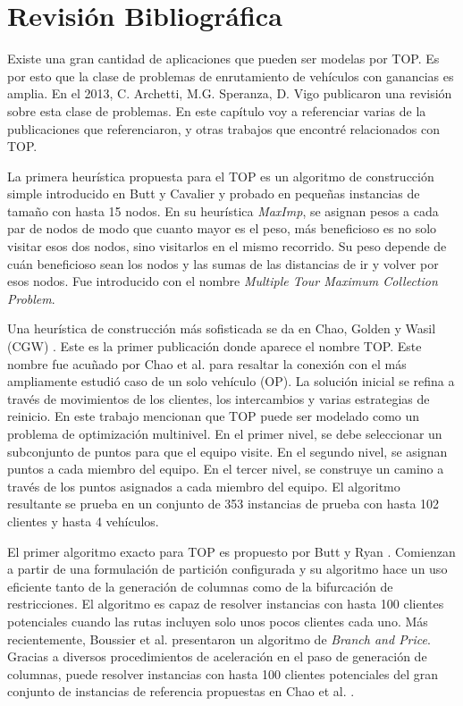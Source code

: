 

\chapter{Revisión Bibliográfica}

Existe una gran cantidad de aplicaciones que pueden ser modelas por TOP. Es por esto que la clase de problemas de enrutamiento de vehículos con ganancias es amplia. En el 2013, C. Archetti, M.G. Speranza, D. Vigo \cite{ArchettiSperanzaVigo} publicaron una revisión sobre esta clase de problemas. En este capítulo voy a referenciar varias de la publicaciones que referenciaron, y otras trabajos que encontré relacionados con TOP.

\bigskip

La primera heurística propuesta para el TOP es un algoritmo de construcción simple introducido en Butt y Cavalier \cite{ButtCavalier} y probado en pequeñas instancias de tamaño con hasta 15 nodos. En su heurística \textit{MaxImp}, se asignan pesos a cada par de nodos de modo que cuanto mayor es el peso, más beneficioso es no solo visitar esos dos nodos, sino visitarlos en el mismo recorrido. Su peso depende de cuán beneficioso sean los nodos y las sumas de las distancias de ir y volver por esos nodos. Fue introducido con el nombre \textit{Multiple Tour Maximum Collection Problem}.

\bigskip

Una heurística de construcción más sofisticada se da en Chao, Golden y Wasil (CGW) \cite{ChaoGoldenWasil}. Este es la primer publicación donde aparece el nombre TOP. Este nombre fue acuñado por Chao et al. para resaltar la conexión con el más ampliamente estudió caso de un solo vehículo (OP). La solución inicial se refina a través de movimientos de los clientes, los intercambios y varias estrategias de reinicio. En este trabajo mencionan que TOP puede ser modelado como un problema de optimización multinivel. En el primer nivel, se debe seleccionar un subconjunto de puntos para que el equipo visite. En el segundo nivel, se asignan puntos a cada miembro del equipo. En el tercer nivel, se construye un camino a través de los puntos asignados a cada miembro del equipo. El algoritmo resultante se prueba en un conjunto de 353 instancias de prueba con hasta 102 clientes y hasta 4 vehículos.

\bigskip

El primer algoritmo exacto para TOP es propuesto por Butt y Ryan \cite{ButtRyan}. Comienzan a partir de una formulación de partición configurada y su algoritmo hace un uso eficiente tanto de la generación de columnas como de la bifurcación de restricciones. El algoritmo es capaz de resolver instancias con hasta 100 clientes potenciales cuando las rutas incluyen solo unos pocos clientes cada uno. Más recientemente, Boussier et al. \cite{BoussierFeilletGendreau} presentaron un algoritmo de \textit{Branch and Price}. Gracias a diversos procedimientos de aceleración en el paso de generación de columnas, puede resolver instancias con hasta 100 clientes potenciales del gran conjunto de instancias de referencia propuestas en Chao et al. \cite{ChaoGoldenWasil}.

